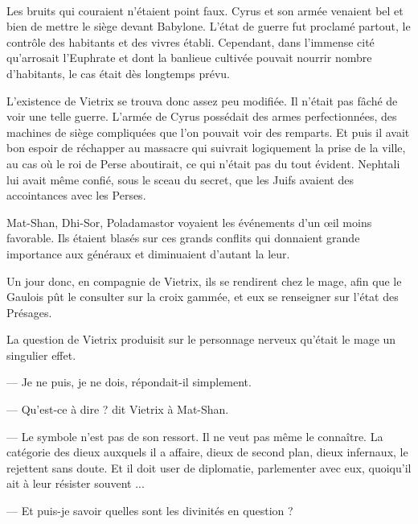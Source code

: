 \documentclass[a4paper, 11pt, oneside, polutonikogreek, french]{article}
\begin{document}
\paragraph{}
Les bruits qui couraient n'étaient point faux. Cyrus et son armée venaient bel et bien de mettre le siège devant Babylone. L'état de guerre fut proclamé partout, le contrôle des habitants et des vivres établi. Cependant, dans l'immense cité qu'arrosait l'Euphrate et dont la banlieue cultivée pouvait nourrir nombre d'habitants, le cas était dès longtemps prévu.

L'existence de Vietrix se trouva donc assez peu modifiée. Il n'était pas fâché de voir une telle guerre. L'armée de Cyrus possédait des armes perfectionnées, des machines de siège compliquées que l'on pouvait voir des remparts. Et puis il avait bon espoir de réchapper au massacre qui suivrait logiquement la prise de la ville, au cas où le roi de Perse aboutirait, ce qui n'était pas du tout évident. Nephtali lui avait même confié, sous le sceau du secret, que les Juifs avaient des accointances avec les Perses.

\bigskip
\centerline{\EightStarTaper}
\centerline{\EightStarTaper\EightStarTaper}
\bigskip

Mat-Shan, Dhi-Sor, Poladamastor voyaient les événements d'un œil moins favorable. Ils étaient blasés sur ces grands conflits qui donnaient grande importance aux généraux et diminuaient d'autant la leur.

Un jour donc, en compagnie de Vietrix, ils se rendirent chez le mage, afin que le Gaulois pût le consulter sur la croix gammée, et eux se renseigner sur l'état des Présages.

La question de Vietrix produisit sur le personnage nerveux qu'était le mage un singulier effet.

--- Je ne puis, je ne dois, répondait-il simplement.

--- Qu'est-ce à dire ? dit Vietrix à Mat-Shan.

--- Le symbole n'est pas de son ressort. Il ne veut pas même le connaître. La catégorie des dieux auxquels il a affaire, dieux de second plan, dieux infernaux, le rejettent sans doute. Et il doit user de diplomatie, parlementer avec eux, quoiqu'il ait à leur résister souvent ...

--- Et puis-je savoir quelles sont les divinités en question ?

\bigskip
\centerline{\EightStarTaper}
\centerline{\EightStarTaper\EightStarTaper}
\bigskip
\end{document}
